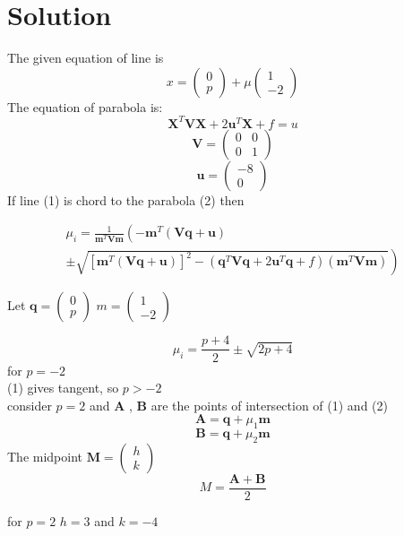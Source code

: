 \documentclass[10pt, a4paper]{article}
\providecommand{\brak}[1]{\ensuremath{\left(#1\right)}}
\providecommand{\lbrak}[1]{\ensuremath{\left(#1\right.}}
\providecommand{\rbrak}[1]{\ensuremath{\left.#1\right)}}
\providecommand{\sbrak}[1]{\ensuremath{{}\left[#1\right]}}
\newcommand{\myvec}[1]{\ensuremath{\begin{pmatrix}#1\end{pmatrix}}}
\let\vec\mathbf
\begin{document}
\section{Solution}
The given equation of line is
\begin{equation}
    x = \myvec{0 \\ p} + \mu\myvec{1\\-2}
\end{equation}
The equation of parabola is:
\begin{equation}
    \vec{X}^T\vec{V}\vec{X} + 2\vec{u}^T\vec{X} + f = u
\end{equation}
\begin{equation}
    \vec{V} = \myvec{0&0\\0&1}
\end{equation}
\begin{equation}
    \vec{u} = \myvec{-8 \\ 0}
\end{equation}
If line (1) is chord to the parabola (2) then
\begin{center}
\begin{multline}
\mu_i = \frac{1}
{
\vec{m}^T\vec{V}\vec{m}
}
\lbrak{-\vec{m}^T\brak{\vec{V}\vec{q}+\vec{u}}}
\\
\pm
\rbrak{\sqrt{
\sbrak{
\vec{m}^T\brak{\vec{V}\vec{q}+\vec{u}}
}^2
-
\brak
{
\vec{q}^T\vec{V}\vec{q} + 2\vec{u}^T\vec{q} +f
}
\brak{\vec{m}^T\vec{V}\vec{m}}
}
}
\end{multline}
\end{center}
Let $\vec{q} = \myvec{0 \\ p}$ $m = \myvec{1\\-2}$

\begin{equation}
    \mu_i = \frac{p+4}{2} \pm \sqrt{2p + 4}
\end{equation}
for $p = -2$\\
(1) gives tangent, so $p > -2$\\
consider $p=2$ and $\vec{A}$ , $\vec{B}$ are the points of intersection of (1) and (2)
\begin{equation}
    \vec{A} = \vec{q} + \mu_1\vec{m} 
\end{equation}
\begin{equation}
    \vec{B} = \vec{q} + \mu_2\vec{m} 
\end{equation}
The midpoint $\vec{M} = \myvec{h \\ k}$ 
\begin{equation}
M = \frac{\vec{A} + \vec{B}}{2}
\end{equation}

for $p = 2$  $h = 3$ and $k =-4 $
\end{document}
